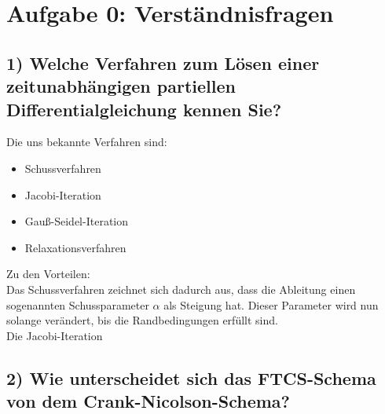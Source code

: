 \setcounter{secnumdepth}{0}
\section{Aufgabe 0: Verständnisfragen}
\label{sec:auf0}

\subsection{1) Welche Verfahren zum Lösen einer zeitunabhängigen partiellen Differentialgleichung kennen Sie?}
Die uns bekannte Verfahren sind:
\begin{itemize}
    \item Schussverfahren
    \item Jacobi-Iteration
    \item Gauß-Seidel-Iteration
    \item Relaxationsverfahren
\end{itemize}
Zu den Vorteilen:\\
Das Schussverfahren zeichnet sich dadurch aus, dass die Ableitung einen sogenannten Schussparameter $\alpha$ als Steigung hat.
Dieser Parameter wird nun solange verändert, bis die Randbedingungen erfüllt sind.
\newline\\
Die Jacobi-Iteration 

\subsection{2) Wie unterscheidet sich das FTCS-Schema von dem Crank-Nicolson-Schema?}